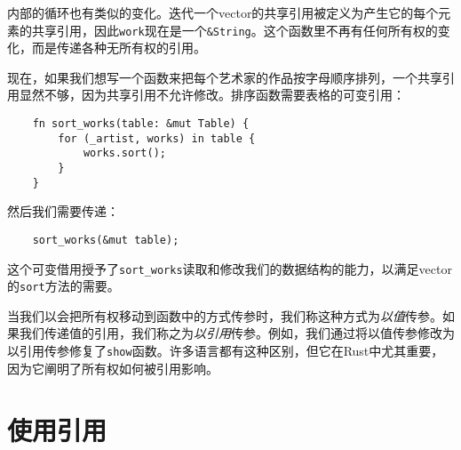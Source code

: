 内部的循环也有类似的变化。迭代一个vector的共享引用被定义为产生它的每个元素的共享引用，因此\texttt{work}现在是一个\texttt{\&String}。这个函数里不再有任何所有权的变化，而是传递各种无所有权的引用。

现在，如果我们想写一个函数来把每个艺术家的作品按字母顺序排列，一个共享引用显然不够，因为共享引用不允许修改。排序函数需要表格的可变引用：
\begin{verbatim}
    fn sort_works(table: &mut Table) {
        for (_artist, works) in table {
            works.sort();
        }
    }
\end{verbatim}

然后我们需要传递：
\begin{verbatim}
    sort_works(&mut table);
\end{verbatim}

这个可变借用授予了\texttt{sort\_works}读取和修改我们的数据结构的能力，以满足vector的\texttt{sort}方法的需要。

当我们以会把所有权移动到函数中的方式传参时，我们称这种方式为\emph{以值}传参。如果我们传递值的引用，我们称之为\emph{以引用}传参。例如，我们通过将以值传参修改为以引用传参修复了\texttt{show}函数。许多语言都有这种区别，但它在Rust中尤其重要，因为它阐明了所有权如何被引用影响。

\section{使用引用}















